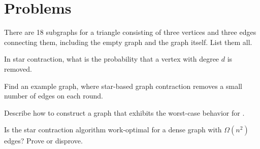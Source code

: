 \section{Problems}

\begin{probl}{}
There are 18 subgraphs for a triangle consisting of three vertices
and three edges connecting them, including the empty graph and the graph
itself.    List them all.
\end{probl}


\begin{probl}{}
In star contraction, what is the probability that a vertex with degree
$d$ is removed.
\end{probl}


\begin{probl}{}
Find an example graph, where star-based graph contraction removes a
small number of edges on each round.
\end{probl}


\begin{probl}{}
Describe how to construct a graph that exhibits the worst-case
behavior for .
\end{probl}

\begin{probl}{}
Is the star contraction algorithm work-optimal for a dense graph with
$\Omega(n^2)$ edges? Prove or disprove.
\end{probl}

